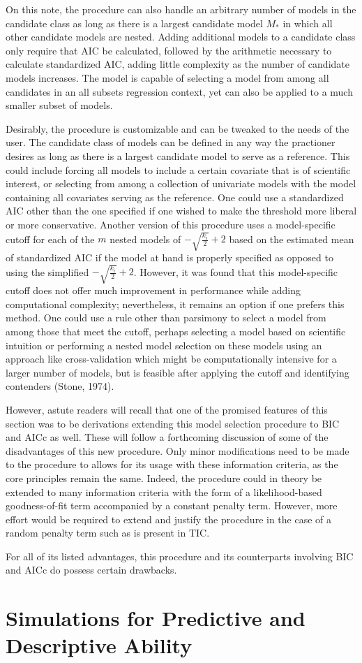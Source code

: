 		On this note, the procedure can also handle an arbitrary number of models in the candidate class as long as there is a largest candidate model $M_*$ in which all
		other candidate models are nested. Adding additional models to a candidate class only require that AIC be calculated, followed by the arithmetic necessary to
		calculate standardized AIC, adding little complexity as the number of candidate models increases. The model is capable of selecting a model from among all
		candidates in an all subsets regression context, yet can also be applied to a much smaller subset of models.

		Desirably, the procedure is customizable and can be tweaked to the needs of the user. The candidate class of models can be defined in any way the practioner desires
		as long as there is a largest candidate model to serve as a reference. This could include forcing all models to include a certain covariate that is of scientific
		interest, or selecting from among a collection of univariate models with the model containing all covariates serving as the reference. One could use a standardized
		AIC other than the one specified if one wished to make the threshold more liberal or more conservative. Another version of this procedure uses a model-specific
		cutoff for each of the $m$ nested models of $-\sqrt{\frac{k_i}{2}} + 2$ based on the estimated mean of standardized AIC if the model at hand is properly specified
		as opposed to using the simplified $-\sqrt{\frac{k_i}{2}} + 2$. However, it was found that this model-specific cutoff does not offer much improvement in performance
		while adding computational complexity; nevertheless, it remains an option if one prefers this method. One could use a rule other than parsimony to select a model
		from among those that meet the cutoff, perhaps selecting a model based on scientific intuition or performing a nested model selection on these models using
		an approach like cross-validation which might be computationally intensive for a larger number of models, but is feasible after applying the cutoff and
		identifying contenders (Stone, 1974).

		However, astute readers will recall that one of the promised features of this section was to be derivations extending this model selection procedure to BIC and
		AICc as well. These will follow a forthcoming discussion of some of the disadvantages of this new procedure. Only minor modifications need to be made to the
		procedure to allows for its usage with these information criteria, as the core principles remain the same. Indeed, the procedure could in theory be extended to
		many information criteria with the form of a likelihood-based goodness-of-fit term accompanied by a constant penalty term. However, more effort would be required
		to extend and justify the procedure in the case of a random penalty term such as is present in TIC.

		For all of its listed advantages, this procedure and its counterparts involving BIC and AICc do possess certain drawbacks. 


		\section{Simulations for Predictive and Descriptive Ability} \label{sec:sim_model_select}
		
